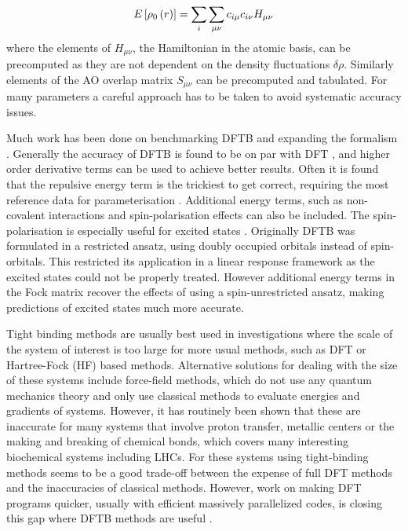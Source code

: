 \begin{equation}
    E_{} \left[ \rho_0\left(r\right) \right] = \sum_i \sum_{\mu\nu} c_{i\mu}c_{i\nu} H_{\mu\nu}
\end{equation}
%
where the elements of $H_{\mu\nu}$, the Hamiltonian in the atomic basis, can be 
precomputed as they are not dependent on the density fluctuations $\delta \rho$. 
Similarly elements of the AO overlap matrix $S_{\mu\nu}$ can be precomputed and 
tabulated. For many parameters a careful approach has to be taken to avoid systematic 
accuracy issues.

Much work has been done on benchmarking DFTB and expanding the formalism \cite{Koskinen2009, Goldman2012, AndreaRozzi2004, Kohler2005, Niehaus2005, Han2000}. 
Generally the accuracy of DFTB is found to be on par with DFT \cite{Lutsker2015, Gruden2017, Vuong2018},
and higher order derivative terms can be used to achieve better results. Often it
is found that the repulsive energy term is the trickiest to get correct, requiring 
the most reference data for parameterisation \cite{Koskinen2009}. Additional energy 
terms, such as non-covalent interactions and spin-polarisation effects can also 
be included. The spin-polarisation is especially useful for excited states \cite{Melix2016}. 
Originally DFTB was formulated in a restricted ansatz, using doubly occupied orbitals 
instead of spin-orbitals. This restricted its application in a linear response framework 
as the excited states could not be properly treated. However additional energy terms 
in the Fock matrix recover the effects of using a spin-unrestricted ansatz, making 
predictions of excited states much more accurate.

Tight binding methods are usually best used in investigations where the scale of 
the  system of interest is too large for more usual methods, such as DFT or Hartree-Fock 
(HF) based methods. Alternative solutions for dealing with the size of these systems 
include force-field methods, which do not use any quantum mechanics theory and only
use classical methods to evaluate energies and gradients of systems. However, it
has routinely been shown that these are inaccurate for many systems that involve 
proton transfer, metallic centers or the making and breaking of chemical bonds\cite{Salomon-Ferrer2013},
which covers many interesting biochemical systems including LHCs. For these systems
using tight-binding methods seems to be a good trade-off between the expense of 
full DFT methods and the inaccuracies of classical methods. However, work on making 
DFT programs quicker, usually with efficient massively parallelized codes, is closing 
this gap where DFTB methods are useful \cite{Manathunga2020}.

